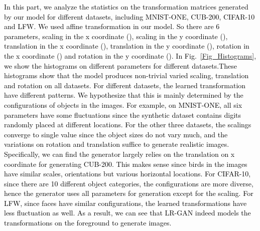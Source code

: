 \documentclass{article} \usepackage{iclr2017_conference,times}
\begin{document}
\textcolor{black}{In this part, we analyze the statistics on the transformation matrices generated by our model for different datasets, including MNIST-ONE, CUB-200, CIFAR-10 and LFW. We used affine transformation in our model. So there are 6 parameters, scaling in the x coordinate (), scaling in the y coordinate (), translation in the x coordinate (), translation in the y coordinate (), rotation in the x coordinate () and rotation in the y coordinate (). In Fig.~\ref{Fig_Histograms}, we show the histograms on different parameters for different datasets.These histograms show that the model produces non-trivial varied scaling, translation and rotation on all datasets. For different datasets, the learned transformation have different patterns. We hypothesize that this is mainly determined by the configurations of objects in the images. For example, on MNIST-ONE, all six parameters have some fluctuations since the synthetic dataset contains digits randomly placed at different locations. For the other three datasets, the scalings converge to single value since the object sizes do not vary much, and the variations on rotation and translation suffice to generate realistic images. Specifically, we can find the generator largely relies on the translation on x coordinate for generating CUB-200. This makes sense since birds in the images have similar scales, orientations but various horizontal locations. For CIFAR-10, since there are 10 different object categories, the configurations are more diverse, hence the generator uses all parameters for generation except for the scaling.  For LFW, since faces have similar configurations, the learned transformations have less fluctuation as well. As a result, we can see that LR-GAN indeed models the transformations on the foreground to generate images.}
\end{document}
